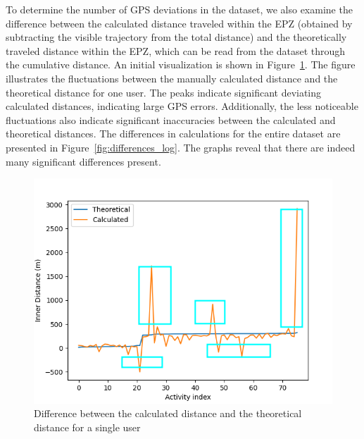 \documentclass[conference]{IEEEtran}
\begin{document}
To determine the number of GPS deviations in the dataset, we also examine the
difference between the calculated distance traveled within the EPZ (obtained by
subtracting the visible trajectory from the total distance) and the
theoretically traveled distance within the EPZ, which can be read from the
dataset through the cumulative distance. An initial visualization is shown in
Figure~\ref{fig:difference_noCDF}. The figure illustrates the fluctuations
between the manually calculated distance and the theoretical distance for one
user. The peaks indicate significant deviating calculated distances, indicating
large GPS errors. Additionally, the less noticeable fluctuations also indicate
significant inaccuracies between the calculated and theoretical distances. The
differences in calculations for the entire dataset are presented in
Figure~\ref{fig:differences_log}. The graphs reveal that there are indeed many
significant differences present.
\begin{figure}[h]
    \centering
    \includegraphics[width=\linewidth]{fig/Afwijkingen&Analyses/Graphs/Verschil_Theoretische_innerDistance.png}
    \caption{Difference between the calculated distance and the theoretical distance for a single user}\label{fig:difference_noCDF}
\end{figure}
\end{document}
